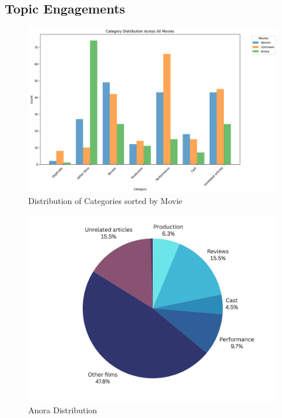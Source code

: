 \documentclass[letterpaper]{article} %
\begin{document}
\subsection{Topic Engagements}
\begin{figure}[H]
\centering
\includegraphics[width=0.9\columnwidth]{LaTeX/all_movies_distribution.png}
\caption{Distribution of Categories sorted by Movie}
\label{fig:all_movies_distribution}
\end{figure}

\begin{figure}[H]
\centering
\includegraphics[width=0.9\columnwidth]{LaTeX/anora_dist.png}
\caption{Anora Distribution}
\label{fig:anora_dist}
\end{figure}
\end{document}
